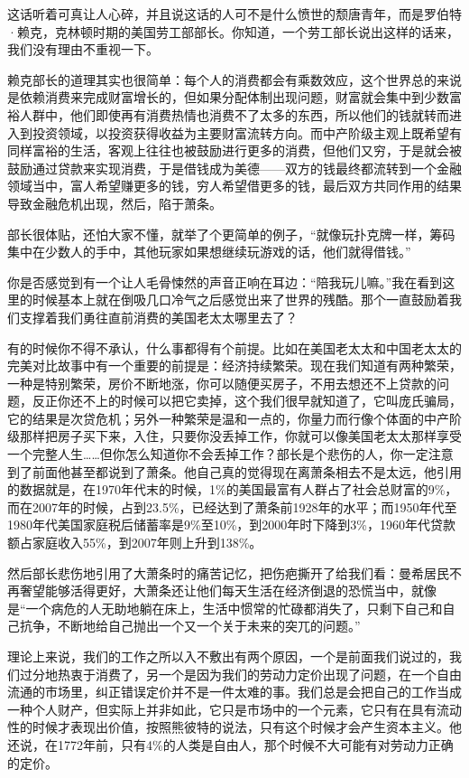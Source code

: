 这话听着可真让人心碎，并且说这话的人可不是什么愤世的颓唐青年，而是罗伯特·赖克，克林顿时期的美国劳工部部长。你知道，一个劳工部长说出这样的话来，我们没有理由不重视一下。

赖克部长的道理其实也很简单：每个人的消费都会有乘数效应，这个世界总的来说是依赖消费来完成财富增长的，但如果分配体制出现问题，财富就会集中到少数富裕人群中，他们即使再有消费热情也消费不了太多的东西，所以他们的钱就转而进入到投资领域，以投资获得收益为主要财富流转方向。而中产阶级主观上既希望有同样富裕的生活，客观上往往也被鼓励进行更多的消费，但他们又穷，于是就会被鼓励通过贷款来实现消费，于是借钱成为美德------双方的钱最终都流转到一个金融领域当中，富人希望赚更多的钱，穷人希望借更多的钱，最后双方共同作用的结果导致金融危机出现，然后，陷于萧条。

部长很体贴，还怕大家不懂，就举了个更简单的例子，``就像玩扑克牌一样，筹码集中在少数人的手中，其他玩家如果想继续玩游戏的话，他们就得借钱。''

你是否感觉到有一个让人毛骨悚然的声音正响在耳边：``陪我玩儿嘛。''我在看到这里的时候基本上就在倒吸几口冷气之后感觉出来了世界的残酷。那个一直鼓励着我们支撑着我们勇往直前消费的美国老太太哪里去了？

有的时候你不得不承认，什么事都得有个前提。比如在美国老太太和中国老太太的完美对比故事中有一个重要的前提是：经济持续繁荣。现在我们知道有两种繁荣，一种是特别繁荣，房价不断地涨，你可以随便买房子，不用去想还不上贷款的问题，反正你还不上的时候可以把它卖掉，这个我们很早就知道了，它叫庞氏骗局，它的结果是次贷危机；另外一种繁荣是温和一点的，你量力而行像个体面的中产阶级那样把房子买下来，入住，只要你没丢掉工作，你就可以像美国老太太那样享受一个完整人生\ldots\ldots 但你怎么知道你不会丢掉工作？部长是个悲伤的人，你一定注意到了前面他甚至都说到了萧条。他自己真的觉得现在离萧条相去不是太远，他引用的数据就是，在1970年代末的时候，1\%的美国最富有人群占了社会总财富的9\%，而在2007年的时候，占到23.5\%，已经达到了萧条前1928年的水平；而1950年代至1980年代美国家庭税后储蓄率是9\%至10\%，到2000年时下降到3\%，1960年代贷款额占家庭收入55\%，到2007年则上升到138\%。

然后部长悲伤地引用了大萧条时的痛苦记忆，把伤疤撕开了给我们看：曼希居民不再奢望能够活得更好，大萧条还让他们每天生活在经济倒退的恐慌当中，就像是``一个病危的人无助地躺在床上，生活中惯常的忙碌都消失了，只剩下自己和自己抗争，不断地给自己抛出一个又一个关于未来的突兀的问题。''

理论上来说，我们的工作之所以入不敷出有两个原因，一个是前面我们说过的，我们过分地热衷于消费了，另一个是因为我们的劳动力定价出现了问题，在一个自由流通的市场里，纠正错误定价并不是一件太难的事。我们总是会把自己的工作当成一种个人财产，但实际上并非如此，它只是市场中的一个元素，它只有在具有流动性的时候才表现出价值，按照熊彼特的说法，只有这个时候才会产生资本主义。他还说，在1772年前，只有4\%的人类是自由人，那个时候不大可能有对劳动力正确的定价。

